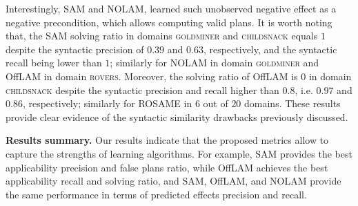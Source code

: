 \documentclass[letterpaper]{article} %
\newcommand{\sam}{\ac{SAM}\xspace}
\newcommand{\nolam}{NOLAM\xspace}
\newcommand{\offlam}{OffLAM\xspace}
\newcommand{\rosame}{ROSAME\xspace}
\newcommand{\samshort}{SAM\xspace}
\newcommand{\miniparagraph}[1]{\textbf{#1.}}
\newif\ifaddcomments
\newcommand{\roni}[1]{\ifaddcomments{\textcolor{red}{[Roni: #1]}}\fi}
\newcommand{\yarin}[1]{\ifaddcomments{\textcolor{teal}{[Yarin: #1]}}\fi}
\newcommand{\leo}[1]{\ifaddcomments{\textcolor{pink}{[Leonardo: #1]}}\fi}
\begin{document}
Interestingly, \samshort and \nolam, learned such unobserved negative effect as a negative precondition, which allows computing valid plans.
%
It is worth noting that, the \samshort solving ratio in domains \textsc{goldminer} and \textsc{childsnack} equals $1$ despite the syntactic precision of $0.39$ and $0.63$, respectively, and the syntactic recall being lower than $1$; similarly for \nolam in domain \textsc{goldminer} and \offlam in domain \textsc{rovers}. 
%
Moreover, the solving ratio of \offlam is $0$ in domain \textsc{childsnack} despite the syntactic precision and recall higher than $0.8$, i.e. $0.97$ and $0.86$, respectively; similarly for \rosame in $6$ out of $20$ domains. 
%
These results provide clear evidence of the syntactic similarity drawbacks previously discussed.






\miniparagraph{Results summary} 
Our results indicate that the proposed metrics allow to capture the strengths of learning algorithms. %
For example, \sam provides the best applicability precision and false plans ratio, while \offlam achieves the best applicability recall and solving ratio, and \sam, \offlam, and \nolam provide the same performance in terms of predicted effects precision and recall. \yarin{Talk about the disadvantages of ROSAME if it does not have an advantage over the others?}
\end{document}
